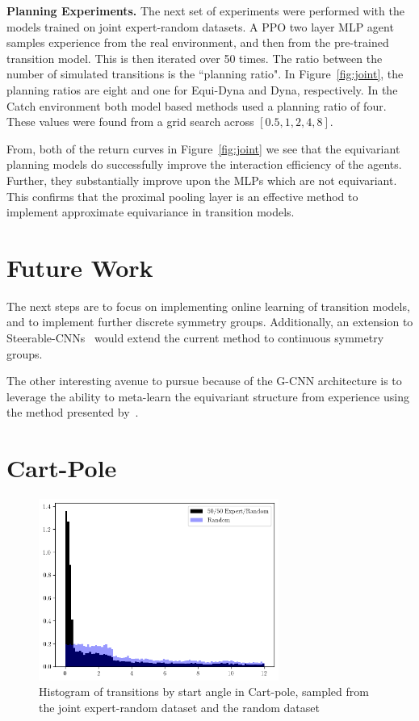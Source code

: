 \documentclass[mlabstract]{jmlr}
\begin{document}
\textbf{Planning Experiments.} The next set of experiments were performed with the models trained on joint expert-random datasets. A PPO two layer MLP agent samples experience from the real environment, and then from the pre-trained transition model. This is then iterated over 50 times. The ratio between the number of simulated transitions is the ``planning ratio". In Figure~\ref{fig:joint}, the planning ratios are eight and one for Equi-Dyna and Dyna, respectively. In the Catch environment both model based methods used a planning ratio of four. These values were found from a grid search across $[0.5, 1, 2, 4,  8]$.

From, both of the return curves in Figure~\ref{fig:joint} we see that the equivariant planning models do successfully improve the interaction efficiency of the agents. Further, they substantially improve upon the MLPs which are not equivariant. This confirms that the proximal pooling layer is an effective method to implement approximate equivariance in transition models.

\vspace{-10}
\section{Future Work}
The next steps are to focus on implementing online learning of transition models, and to implement further discrete symmetry groups. Additionally, an extension to Steerable-CNNs~\cite{weiler2019general} would extend the current method to continuous symmetry groups.

The other interesting avenue to pursue because of the G-CNN architecture is to leverage the ability to meta-learn the equivariant structure from experience using the method presented by~\cite{zhou2020meta}.

\newpage


\newpage
\appendix
\section{Cart-Pole}
\begin{figure}[h]
	\centering
	\includegraphics[width=0.7\textwidth]{Figures/angles_cp.png}
	\caption{Histogram of transitions by start angle in Cart-pole, sampled from the joint expert-random dataset and the random dataset}\label{fig:cp_hist}
\end{figure}
\end{document}
